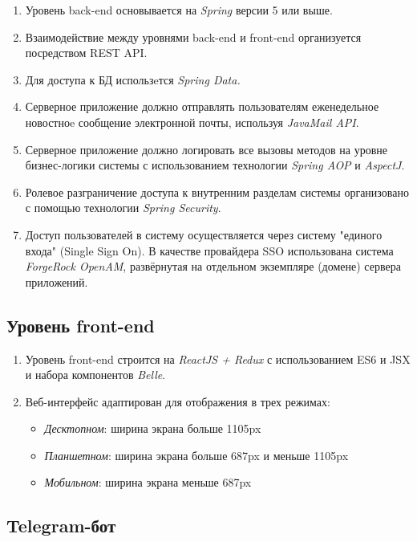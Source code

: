 \documentclass[12pt, a4paper]{article}
\begin{document}
\begin{enumerate}
\item Уровень back-end основывается на \textit{Spring} версии 5 или выше.
\item Взаимодействие между уровнями back-end и front-end организуется
  посредством REST API.
\item Для доступа к БД использeтся \textit{Spring Data.}
\item Серверное приложение должно отправлять пользователям еженедельное 
  новостноe сообщение электронной почты, используя \textit{JavaMail API}.
\item Серверное приложение должно логировать все вызовы методов на уровне 
  бизнес-логики системы с использованием технологии \textit{Spring AOP}
  и \textit{AspectJ}.
\item Ролевое разграничение доступа к внутренним разделам системы 
  организовано с помощью технологии \textit{Spring Security}.
\item Доступ пользователей в систему осуществляется через систему 
  "единого входа" (Single Sign On). В качестве провайдера SSO использована 
  система \textit{ForgeRock OpenAM}, развёрнутая на отдельном экземпляре 
  (домене) сервера приложений.
\end{enumerate}

\subsection{Уровень front-end}

\begin{enumerate}
\item Уровень front-end строится на \textit{ReactJS + Redux} 
  с использованием ES6 и JSX и набора
  компонентов \textit{Belle}.
\item Веб-интерфейс адаптирован для отображения в трех режимах:
  \begin{itemize}
  \item \textit{Десктопном}: ширина экрана больше 1105px
  \item \textit{Планшетном}: ширина экрана больше 687px и меньше 1105px
  \item \textit{Мобильном}: ширина экрана меньше 687px
  \end{itemize}
\end{enumerate}

\subsection{Telegram-бот}
\label{telegram-bot}
\end{document}
